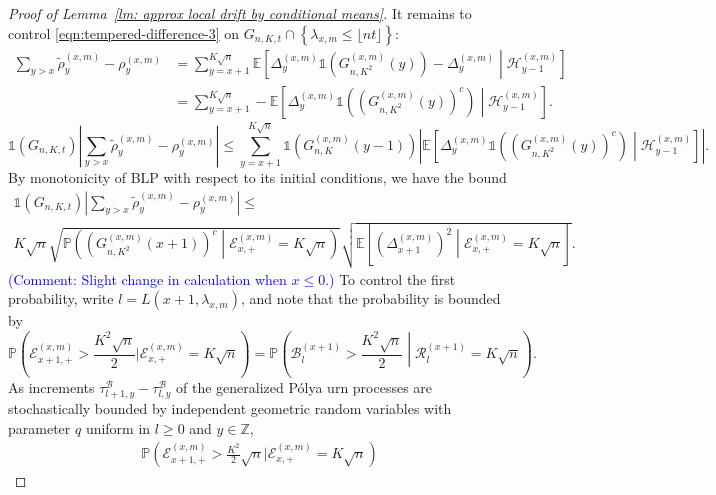 \documentclass[twoside,12pt, a4paper]{article}
\numberwithin{equation}{section}
\theoremstyle{remark}
\newcommand{\comment}[1]{\textcolor{blue}{(Comment: #1)}}
\begin{document}
\begin{proof}[Proof of Lemma~\ref{lm: approx local drift by conditional means}]
		It remains to control  \eqref{eqn:tempered-difference-3} on $G_{n, K, t} \cap \left\{\lambda_{x,m} \leq\lfloor nt \rfloor \right\}$:
		\begin{align*}
			\sum_{y > x} \tilde\rho_y^{(x,m)} - \rho_y^{(x,m)}
			&= \sum_{y = x + 1}^{K \sqrt{n} } \mathbb{E}\left[ \Delta_y^{(x,m)}\mathbb{1}\left( G_{n, K^2}^{(x,m)}(y) \right) - \Delta_{y}^{(x,m)} \middle| \mathcal{H}_{y-1}^{(x,m)}  \right]  \\
			&= \sum_{y = x + 1}^{K \sqrt{n} } -\mathbb{E}\left[ \Delta_y^{(x,m)}\mathbb{1}\left( \left( G_{n, K^2}^{(x,m)}(y) \right) ^c \right) \middle| \mathcal{H}_{y-1}^{(x,m)}  \right]
			.\end{align*}
		\[
		\mathbb{1}(G_{n, K, t}) \left| 
		\sum_{y > x} \tilde\rho_y^{(x,m)} - \rho_y^{(x,m)}
		\right| 
		\le  \sum_{y = x + 1}^{K \sqrt{n} } \mathbb{1}\left(G_{n, K}^{(x,m)}(y-1)\right) 
		\left|  \mathbb{E}\left[ \Delta_y^{(x,m)}\mathbb{1}\left( \left( G_{n, K^2}^{(x,m)}(y) \right) ^c \right) \middle| \mathcal{H}_{y-1}^{(x,m)}  \right] \right| 
		.\] 
		By monotonicity of BLP with respect to its initial conditions, we have the bound
		\begin{multline*}
			\mathbb{1}(G_{n, K, t})
			\left| \sum_{y > x} \tilde\rho_y^{(x,m)} - \rho_y^{(x,m)} \right| \le \\
			K \sqrt{n} 
			\sqrt{ \mathbb{P}\left( \left( G^{(x,m)}_{n, K^2}(x+1) \right) ^{c} \middle| \mathcal{E}_{x,+}^{(x,m)} = K \sqrt{n}  \right) }
			\sqrt{ \mathbb{E}\left[ \left(\Delta_{x+1}^{(x,m)}\right)^2 \middle| \mathcal{E}_{x,+}^{(x,m)} = K \sqrt{n}  \right]}
			.\end{multline*}
		\comment{Slight change in calculation when $x\leq 0$.}
		To control the first probability, write $l = L\left( x+1, \lambda_{x, m} \right) $, and note that the probability is bounded by 
		\[
		\mathbb{P}\left(\mathcal{E}_{x+1,+}^{(x,m)} > \frac{K^2 \sqrt{n} }{2} | \mathcal{E}_{x,+}^{(x, m)} = K \sqrt{n}\right)
		= \mathbb{P}\left(\mathcal{B}^{(x+1)}_{l} > \frac{K^2 \sqrt{n} }{2}  \middle| \mathcal{R}^{(x + 1)}_l = K \sqrt{n}  \right)
		.\] 
		As increments $\tau^{\mathcal{B}}_{l+1,y} -\tau^{\mathcal{B}}_{l,y}$ of the generalized P\'{o}lya urn processes are stochastically bounded by independent geometric random variables with parameter $q$ uniform in $l\geq 0$ and $y \in \mathbb{Z}$, 
		\begin{align*}
			\mathbb{P}(\mathcal{E}_{x+1,+}^{(x,m)} > \frac{K^2}{2} \sqrt{n} | \mathcal{E}_{x,+}^{(x, m)} = K \sqrt{n})

\end{align*}
\end{proof}
\end{document}
